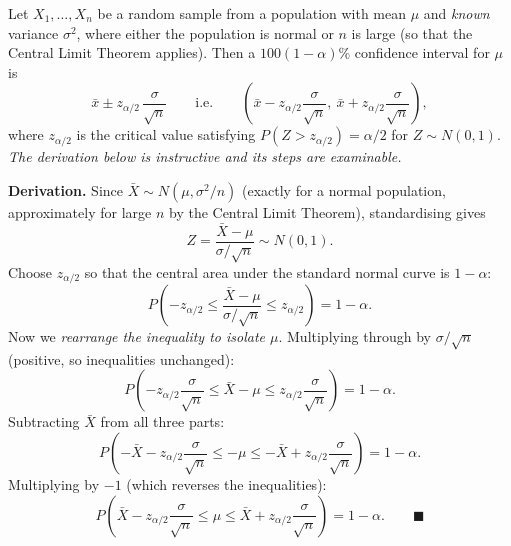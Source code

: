 \documentclass[11pt]{article}
\begin{document}
\begin{propriete}
Let $X_{1}, \dots, X_{n}$ be a random sample from a population with mean $\mu$ and \emph{known} variance $\sigma^{2}$, where either the population is normal or $n$ is large (so that the Central Limit Theorem applies). Then a $100(1-\alpha)\%$ confidence interval for $\mu$ is
\[
\bar{x} \pm z_{\alpha/2}\,\frac{\sigma}{\sqrt{n}}
\qquad\text{i.e.}\qquad
\left(\bar{x} - z_{\alpha/2}\frac{\sigma}{\sqrt{n}},\ \bar{x} + z_{\alpha/2}\frac{\sigma}{\sqrt{n}}\right),
\]
where $z_{\alpha/2}$ is the critical value satisfying $P(Z > z_{\alpha/2}) = \alpha/2$ for $Z \sim N(0,1)$. \emph{The derivation below is instructive and its steps are examinable.}
\end{propriete}

\textbf{Derivation.} Since $\bar{X} \sim N(\mu, \sigma^{2}/n)$ (exactly for a normal population, approximately for large $n$ by the Central Limit Theorem), standardising gives
\[
Z = \frac{\bar{X} - \mu}{\sigma/\sqrt{n}} \sim N(0,1).
\]
Choose $z_{\alpha/2}$ so that the central area under the standard normal curve is $1-\alpha$:
\[
P\!\left(-z_{\alpha/2} \le \frac{\bar{X}-\mu}{\sigma/\sqrt{n}} \le z_{\alpha/2}\right) = 1-\alpha.
\]
Now we \emph{rearrange the inequality to isolate $\mu$}. Multiplying through by $\sigma/\sqrt{n}$ (positive, so inequalities unchanged):
\[
P\!\left(-z_{\alpha/2}\frac{\sigma}{\sqrt{n}} \le \bar{X}-\mu \le z_{\alpha/2}\frac{\sigma}{\sqrt{n}}\right) = 1-\alpha.
\]
Subtracting $\bar{X}$ from all three parts:
\[
P\!\left(-\bar{X} - z_{\alpha/2}\frac{\sigma}{\sqrt{n}} \le -\mu \le -\bar{X} + z_{\alpha/2}\frac{\sigma}{\sqrt{n}}\right) = 1-\alpha.
\]
Multiplying by $-1$ (which reverses the inequalities):
\[
P\!\left(\bar{X} - z_{\alpha/2}\frac{\sigma}{\sqrt{n}} \le \mu \le \bar{X} + z_{\alpha/2}\frac{\sigma}{\sqrt{n}}\right) = 1-\alpha. \qquad \blacksquare
\]
\end{document}
